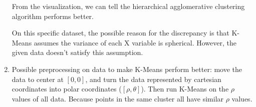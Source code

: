 \documentclass[paper=letter, fontsize=12pt]{article}
\begin{document}
\begin{enumerate}[label=(\alph*)]
	From the visualization, we can tell the hierarchical agglomerative clustering algorithm performs better. 
	
	On this specific dataset, the possible reason for the discrepancy is that K-Means assumes the variance of each X variable is spherical. However, the given data doesn't satisfy this assumption. 
	
	\item Possible preprocessing on data to make K-Means perform better: move the data to center at $[0, 0]$, and turn the data represented by cartesian coordinates into polar coordinates ($[\rho, \theta]$). Then run K-Means on the $\rho$ values of all data. Because points in the same cluster all have similar $\rho$ values. 
	
\end{enumerate}
\end{document}
